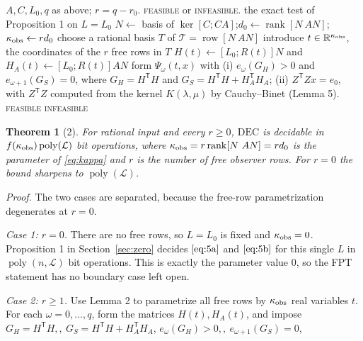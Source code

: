 \documentclass[journal]{IEEEtran}
\theoremstyle{plainn}
\newtheorem*{thm}{Theorem}
\begin{document}
\begin{algorithm}[!t]
\caption{Deciding $\mathrm{DEC}(q)$ in time $f(\kappa_{\rm obs})\operatorname{poly}(\mathcal L)$}
\label{alg:fpt}
\begin{algorithmic}[1]
\Require $A,C,L_0,q$ as above; $r=q-r_0$.
\Ensure \textsc{feasible} or \textsc{infeasible}.
  \State \Return the exact test of Proposition 1 on $L=L_0$
\EndIf
\State $N\gets$ basis of $\ker[C;CA]$;\quad $d_0\gets\operatorname{rank}[N\ AN]$;\quad
$\kappa_{\rm obs}\gets rd_0$
\State choose a rational basis $T$ of $\mathcal T=\operatorname{row}[N\ AN]$
\State introduce $t\in\mathbb R^{\kappa_{\rm obs}}$, the coordinates of the $r$ free rows in $T$
\State $H(t)\gets[L_0;R(t)]N$ and $H_A(t)\gets[L_0;R(t)]AN$
  \State form $\Psi_\omega(t,x)$ with
  \Statex \quad (i) $e_\omega(G_H)>0$ and $e_{\omega+1}(G_S)=0$, where
           $G_H=H^{\mathsf T}H$ and $G_S=H^{\mathsf T}H+H_A^{\mathsf T}H_A$;
  \Statex \quad (ii) $Z^{\mathsf T}Zx=e_0$, with $Z^{\mathsf T}Z$ computed from the kernel
           $K(\lambda,\mu)$ by Cauchy--Binet (Lemma 5).
    \State \Return \textsc{feasible}
  \EndIf
\EndFor
\State \Return \textsc{infeasible}
\end{algorithmic}
\end{algorithm}

\begin{thm}[2] For rational input and every $r\ge0$, $\mathrm{DEC}$ is decidable in
$f(\kappa_{\rm obs})\operatorname{poly}(\mathcal L)$ bit operations, where
$\kappa_{\rm obs}=r\operatorname{rank}[N\ AN]=r d_0$ is the parameter of \eqref{eq:kappa} and $r$ is the number of free observer rows. For $r=0$ the bound sharpens to $\operatorname{poly}(\mathcal L)$.

\end{thm}
\emph{Proof.} The two cases are separated, because the free-row parametrization degenerates at $r=0$.

\emph{Case 1: $r=0$.} There are no free rows, so $L=L_0$ is fixed and $\kappa_{\rm obs}=0$. Proposition 1 in Section~\ref{sec:zero} decides $\eqref{eq:5a}$ and $\eqref{eq:5b}$ for this single $L$ in $\operatorname{poly}(n,\mathcal L)$ bit operations. This is exactly the parameter value $0$, so the FPT statement has no boundary case left open.

\emph{Case 2: $r\ge1$.} Use Lemma 2 to parametrize all free rows by $\kappa_{\rm obs}$ real variables $t$. For each $\omega=0,\dots,q$, form the matrices $H(t),H_A(t)$, and impose $G_H=H^{\mathsf T}H,,\  G_S=H^{\mathsf T}H+H_A^{\mathsf T}H_A$, $e_\omega(G_H)>0,,\  e_{\omega+1}(G_S)=0$,
\end{document}
